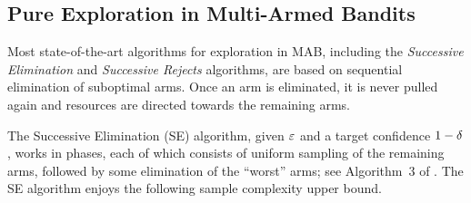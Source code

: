 \documentclass{article}
\begin{document}
%



\subsection{Pure Exploration in Multi-Armed Bandits}


Most state-of-the-art algorithms for exploration in MAB, including the \emph{Successive Elimination} \cite{evendar06} and \emph{Successive Rejects} \cite{audibert10} algorithms, are based on sequential elimination of suboptimal arms. 
Once an arm is eliminated, it is never pulled again and resources are directed towards the remaining arms.

The Successive Elimination (SE) algorithm, 
given $\varepsilon$ and a target confidence $1-\delta$, works in phases, each of which consists of uniform sampling of the remaining arms, followed by some elimination of the ``worst'' arms; see Algorithm~3 of \citet{evendar06}.
The SE algorithm enjoys the following sample complexity upper bound.
\end{document}
